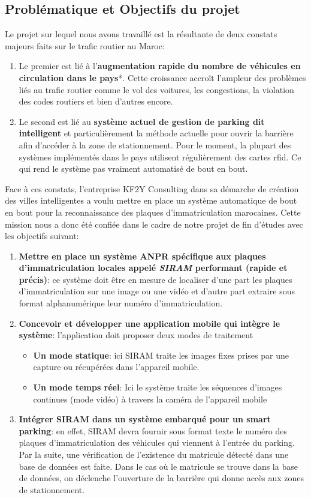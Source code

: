     \subsection{Problématique et Objectifs du projet}
    Le projet sur lequel nous avons travaillé est la résultante de deux constats majeurs faits sur le trafic routier au Maroc:
    \begin{enumerate}
            \item Le premier est lié à l’\textbf{augmentation rapide du nombre de véhicules en circulation dans le pays}*.  Cette croissance accroît l’ampleur des problèmes liés au trafic routier comme le vol des voitures, les congestions, la violation des codes routiers et bien d’autres encore. 
            \item Le second  est lié au \textbf{système actuel de gestion de parking dit intelligent} et particulièrement la méthode actuelle pour ouvrir la barrière afin d'accéder à la zone de stationnement. Pour le moment, la plupart des systèmes implémentés dans le pays utilisent régulièrement des cartes \acrshort{rfid}. Ce qui rend le système pas vraiment automatisé de bout en bout.
        \end{enumerate}
    Face à ces constats, l’entreprise KF2Y Consulting dans sa démarche de création des villes intelligentes a voulu mettre en place un système automatique de bout en bout pour la reconnaissance des plaques d’immatriculation marocaines.  Cette mission nous a donc été confiée dans le cadre de notre projet de fin d'études avec les objectifs suivant:
        \begin{enumerate}
            \item \textbf{Mettre en place un système ANPR spécifique aux plaques d'immatriculation locales appelé \textit{SIRAM} performant (rapide et précis)}: ce système doit être en mesure de localiser d’une part  les plaques d’immatriculation sur une image ou une vidéo et d’autre part extraire sous format alphanumérique leur numéro d’immatriculation.
            \item \textbf{Concevoir et développer une application mobile qui intègre le système}: l’application doit proposer deux modes de traitement
                \begin{itemize}
                    \item \textbf{Un mode statique}: ici SIRAM traite les images fixes prises par une capture ou récupérées dans l’appareil mobile.
                    \item \textbf{Un mode temps réel}: Ici le système traite les séquences d’images continues (mode vidéo) à travers la caméra de l’appareil mobile
                \end{itemize}
            \item \textbf{Intégrer SIRAM dans un système embarqué pour un smart parking}: en effet, SIRAM devra fournir sous format texte le numéro des plaques d’immatriculation des véhicules qui viennent à l’entrée du parking. Par la suite, une vérification de l’existence du matricule détecté dans une base de données est faite. Dans le cas où le matricule se trouve dans la base de données, on déclenche l’ouverture de la barrière qui donne accès aux zones de stationnement.
        \end{enumerate}



